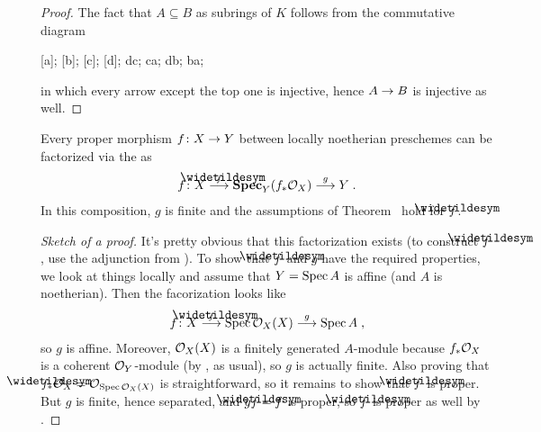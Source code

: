 \documentclass[a4paper,parskip=half,numbers=enddot, DIV=12]{scrreprt}
\begin{document}
\begin{proof}
	The fact that $A\subseteq B$ as subrings of $K$ follows from the commutative diagram
	\begin{diagram*}
		[a];
		[b];
		[c];
		[d];
		\scriptsize
		\arrow dc;
		ca;
		db;
		\isoarrow ba;
	\end{diagram*}
	in which every arrow except the top one is injective, hence $A\morphism B$ is injective as well.
\end{proof}
\begin{fact}
	Every proper morphism $f\colon X\morphism Y$ between locally noetherian preschemes can be factorized via the  as
	\begin{align*}
		f\colon X\morphism[\snake{f}]\SPEC_Y(f_*\Oo_X)\morphism[g]Y\;.
	\end{align*}
	In this composition, $g$ is finite and the assumptions of Theorem~ hold for $\snake{f}$.
\end{fact}
\begin{proof}[Sketch of a proof]
	It's pretty obvious that this factorization exists (to construct $\snake{f}$, use the adjunction from \cite[Proposition~1.6.2]{alggeo2}). To show that $\snake{f}$ and $g$ have the required properties, we look at things locally and assume that $Y=\operatorname{Spec} A$ is affine (and $A$ is noetherian). Then the facorization looks like
	\begin{align*}
		f\colon X\morphism[\snake{f}]\Spec \Oo_X(X)\morphism[g]\Spec A\;,
	\end{align*}
	so $g$ is affine. Moreover, $\mathcal{O}_X(X)$ is a finitely generated $A$-module because $f_*\mathcal{O}_X$ is a coherent $\mathcal{O}_Y$-module (by \cite[Theorem~5]{alggeo2}, as usual), so $g$ is actually finite. Also proving that $\snake{f}_*\Oo_X=\Oo_{\Spec \Oo_X(X)}$ is straightforward, so it remains to show that $\snake{f}$ is proper. But $g$ is finite, hence separated, and $g\snake{f}=f$ is proper, so $\snake{f}$ is proper as well by \cite[Proposition~2.4.1]{alggeo2}.
\end{proof}
\end{document}
